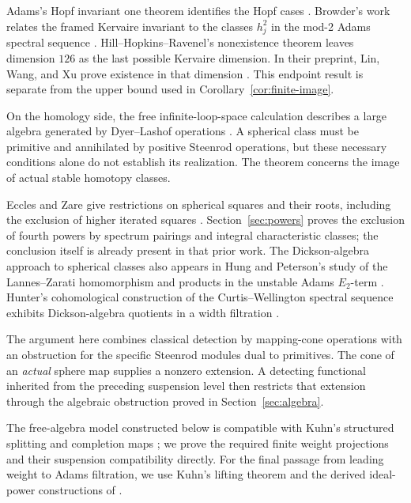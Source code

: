 Adams's Hopf invariant one theorem identifies the Hopf cases
\cite{Adams1960}. Browder's work relates the framed Kervaire invariant
to the classes \(h_j^2\) in the mod-2 Adams spectral sequence
\cite{Browder1969}. Hill--Hopkins--Ravenel's nonexistence theorem
leaves dimension \(126\) as the last possible Kervaire dimension.
In their preprint, Lin, Wang, and Xu prove existence in that dimension
\cite[Theorems~1.1 and~1.4]{LinWangXu2025}. This endpoint result is
separate from the upper bound used in Corollary~\ref{cor:finite-image}.

On the homology side, the free infinite-loop-space
calculation describes a large algebra generated by Dyer--Lashof
operations \cite{CLM1976}. A spherical class must be primitive and
annihilated by positive Steenrod operations, but these necessary
conditions alone do not establish its realization. The theorem concerns
the image of actual stable homotopy classes.

Eccles and Zare give restrictions on spherical squares and their roots,
including the exclusion of higher iterated squares
\cite[Theorem~3.10 and Lemma~3.12]{EcclesZare2009}.
Section~\ref{sec:powers} proves the exclusion of fourth powers by
spectrum pairings and integral characteristic classes; the conclusion
itself is already present in that prior work. The Dickson-algebra
approach to spherical classes also appears in Hung and Peterson's
study of the Lannes--Zarati homomorphism and products in the unstable
Adams \(E_2\)-term \cite{HungPeterson1998}.
Hunter's cohomological construction of the Curtis--Wellington spectral
sequence exhibits Dickson-algebra quotients in a width filtration
\cite[arXiv version~2, Theorem~1.2]{Hunter2025}.

The argument here combines classical detection by mapping-cone
operations with an obstruction for the specific Steenrod modules
dual to primitives. The cone of an \emph{actual} sphere map supplies
a nonzero extension. A detecting functional inherited from the
preceding suspension level then restricts that extension through the
algebraic obstruction proved in Section~\ref{sec:algebra}.

The free-algebra model constructed below is compatible with Kuhn's
structured splitting and completion maps \cite{Kuhn2006}; we prove
the required finite weight projections and their suspension
compatibility directly. For the final passage from leading
weight to Adams filtration, we use Kuhn's lifting theorem
\cite{Kuhn2018} and the derived ideal-power constructions of
\cite{KuhnPereira2017}.

